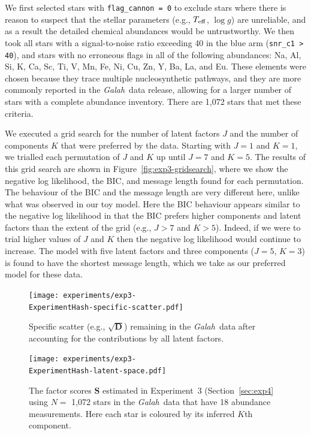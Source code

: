 \documentclass[twocolumn]{aastex62}
\newcommand\teff{T_{\rm eff}}
\newcommand\logg{\log{g}}
\newcommand{\project}[1]{\textsl{#1}}
\newcommand{\Galah}{\project{Galah}}
\newcommand{\vect}[1]{\boldsymbol{\mathbf{#1}}}
\renewcommand{\vec}[1]{\vect{#1}}
\newcommand{\factorscores}{\textbf{S}}
\newcommand{\specificvariance}{\vec{D}}
\newcommand{\NumLatentFactors}{J}
\newcommand{\NumComponents}{K}
\newcommand{\ExperimentHash}{89dab}
\begin{document}
We first selected stars with \texttt{flag\_cannon = 0} to exclude
stars where there is reason to suspect that the stellar parameters
(e.g., $\teff$, $\logg$) are unreliable, and as a result the 
detailed chemical abundances would be untrustworthy. We then took all
stars with a signal-to-noise ratio exceeding 40 in the blue arm (\texttt{snr\_c1 > 40}), and
stars with no erroneous flags in all of the following abundances: Na, Al, Si, K, Ca, Sc, Ti, V, Mn, Fe, Ni, Cu, Zn, Y, Ba, La, and Eu.
These elements were chosen because they trace multiple nucleosynthetic pathways, and they are more commonly reported in the \Galah\ data release, allowing for a larger number of stars with a complete abundance inventory.
There are 1,072 stars that met these criteria. 



We executed a grid search for the number of latent factors $\NumLatentFactors$
and the number of components $\NumComponents$ that were preferred by the data.
Starting with $\NumLatentFactors = 1$ and $\NumComponents = 1$, we trialled each
permutation of $\NumLatentFactors$ and $\NumComponents$ up until $\NumLatentFactors = 7$
and $\NumComponents = 5$. 
The results of this grid search are shown in Figure~\ref{fig:exp3-gridsearch},
where we show the negative log likelihood, the BIC, and message length found for each permutation.
The behaviour of the BIC and the message length are very different here, unlike what was observed
in our toy model. Here the BIC behaviour appears similar to the negative log likelihood in that the BIC
prefers higher components and latent factors than the extent of the grid (e.g., $J > 7$ and $K > 5$). Indeed, if we were to trial higher values of $J$ and $K$ then the negative log likelihood would continue to increase.
The model with five latent factors and three components ($J = 5$, $K = 3$) is found to have the shortest message length, which we take as our preferred model for these data.



\begin{figure}
	\texttt{[image: experiments/exp3-\\ExperimentHash-specific-scatter.pdf]}
	\caption{Specific scatter (e.g., $\sqrt{\specificvariance}$) remaining in the \Galah\ data \citep{Buder:2018}
			 after accounting for the contributions by all
			 latent factors.}
    \label{fig:exp3-specific-scatter}
\end{figure}




\begin{figure}
	\texttt{[image: experiments/exp3-\\ExperimentHash-latent-space.pdf]}
	\caption{The factor scores $\factorscores$ estimated in Experiment~3 (Section~\ref{sec:exp4} using $N =$ 1,072 stars in the \Galah\ data \citep{Buder:2018} that have 18 abundance measurements. Here each star is coloured by its inferred $K$th component.}
    \label{fig:exp3-latent-space}
\end{figure}
\end{document}
